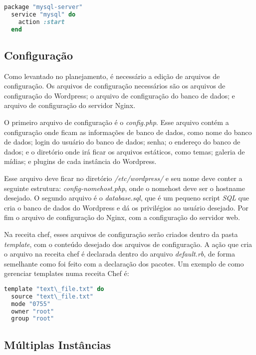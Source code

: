 \begin{lstlisting}[language=Ruby,label=dice_index,caption={Exemplo de criação de serviço do mysql com o chef}]
  package "mysql-server"
  service "mysql" do
    action :start
  end
\end{lstlisting}


\subsection{Configuração}
\label{wordpress:preparacao}

Como levantado no planejamento, é necessário a edição de arquivos de configuração. Os
arquivos de configuração necessários são os arquivos de configuração do Wordpress; 
o arquivo de configuração do banco de dados; e arquivo de configuração do servidor Nginx.

O primeiro arquivo de configuração é o \textit{config.php}. Esse arquivo contém a
configuração onde ficam as informações de banco de dados, como nome do banco de dados;
login do usuário do banco de dados; senha; o endereço do banco de dados; e o diretório
onde irá ficar os arquivos estáticos, como temas; galeria de mídias; e plugins 
de cada instância do Wordpress.

Esse arquivo deve ficar no diretório \textit{/etc/wordpress/} e seu nome deve conter
a seguinte estrutura: \textit{config-nomehost.php}, onde o nomehost deve ser o hostname
desejado. O segundo arquivo é o \textit{database.sql}, que é um pequeno script \textit{SQL} que
cria o banco de dados do Wordpress e dá os privilégios ao usuário desejado. Por fim
o arquivo de configuração do Nginx, com a configuração do servidor web.

Na receita chef, esses arquivos de configuração serão criados dentro da pasta 
\textit{template}, com o conteúdo
desejado dos arquivos de configuração. A ação que cria o arquivo na receita chef é 
declarada dentro do arquivo \textit{default.rb}, de forma semelhante como foi feito com
a declaração dos pacotes. Um exemplo de como gerenciar templates numa receita Chef
é:

\begin{lstlisting}[language=Ruby,label=dice_index,caption={Exemplo de criação de templates com o chef}]
  template "text\_file.txt" do
  source "text\_file.txt"
  mode "0755"
  owner "root"
  group "root"
\end{lstlisting}

\subsection{Múltiplas Instâncias}

